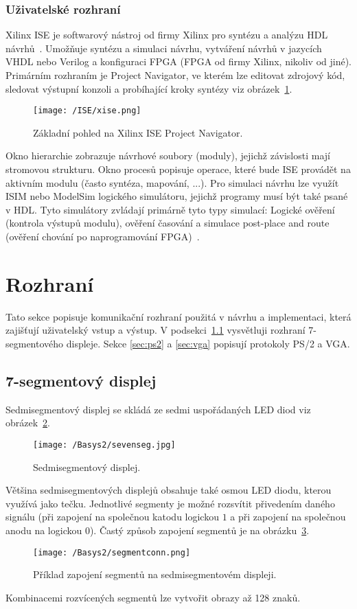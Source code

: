 \documentclass{report}
\begin{document}
\subsubsection{Uživatelské rozhraní}
Xilinx ISE je softwarový nástroj od firmy Xilinx pro syntézu a analýzu HDL návrhů~\cite{xiseman}. Umožňuje syntézu a simulaci návrhu, vytváření návrhů v jazycích VHDL nebo Verilog a konfiguraci FPGA (FPGA od firmy Xilinx, nikoliv od jiné). Primárním rozhraním je Project Navigator, ve kterém lze editovat zdrojový kód, sledovat výstupní konzoli a probíhající kroky syntézy viz obrázek~\ref{fig:xise}. 
\begin{figure}
\centering
\texttt{[image: /ISE/xise.png]}
\caption{Základní pohled na Xilinx ISE Project Navigator.}
\label{fig:xise}
\end{figure}
Okno hierarchie zobrazuje návrhové soubory (moduly), jejichž závislosti mají stromovou strukturu. Okno procesů popisuje operace, které bude ISE provádět na aktivním modulu (často syntéza, mapování, ...). Pro simulaci návrhu lze využít ISIM nebo ModelSim logického simulátoru, jejichž programy musí být také psané v HDL. Tyto simulátory zvládají primárně tyto typy simulací: Logické ověření (kontrola výstupů modulu),  ověření časování a simulace post-place and route (ověření chování po naprogramování FPGA)~\cite{xiseman}.

\section{Rozhraní}\label{sec:rozhrani}
Tato sekce popisuje komunikační rozhraní použitá v návrhu a implementaci, která zajišťují uživatelský vstup a výstup. V podsekci~\ref{sec:7segment} vysvětluji rozhraní 7-segmentového displeje. Sekce  \ref{sec:ps2} a \ref{sec:vga} popisují protokoly PS/2 a VGA.
\subsection{7-segmentový displej}\label{sec:7segment}
Sedmisegmentový displej se skládá ze sedmi uspořádaných LED diod viz obrázek~\ref{fig:sevensegment}.
\begin{figure}
\centering
\texttt{[image: /Basys2/sevenseg.jpg]}
\caption{Sedmisegmentový displej.}
\label{fig:sevensegment}
\end{figure}
 Většina sedmisegmentových displejů obsahuje také osmou LED diodu, kterou využívá jako tečku. Jednotlivé segmenty je možné rozsvítit přivedením daného signálu (při zapojení na společnou katodu logickou $1$ a při zapojení na společnou anodu na logickou $0$). Častý způsob zapojení segmentů je na obrázku~\ref{fig:segmentconnection}.
\begin{figure}
\centering
\texttt{[image: /Basys2/segmentconn.png]}
\caption{Příklad zapojení segmentů na sedmisegmentovém displeji.}
\label{fig:segmentconnection}
\end{figure}
Kombinacemi rozvícených segmentů lze vytvořit obrazy až 128 znaků.
\end{document}
